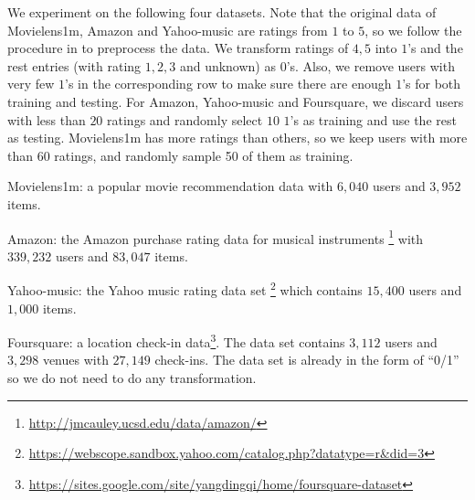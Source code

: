 \documentclass{article}
\begin{document}
We experiment on the following four datasets. 
Note that the original data of Movielens1m, Amazon and Yahoo-music are
ratings from $1$ to $5$, so we follow the procedure in \cite{rendle2009bpr,yu2017selection} to preprocess the data. 
We transform ratings of $4, 5$ into $1$'s and the rest entries (with rating $1, 2, 3$ and unknown) as $0$'s.
Also, we remove users with very few $1$'s in the corresponding row to make sure there are enough $1$'s for both training and testing. 
For Amazon, Yahoo-music and Foursquare, we discard users with less than $20$ ratings and randomly select $10$ $1$'s as training and use the rest as testing. 
Movielens1m has more ratings than others, so we keep users with more than $60$ ratings, and randomly sample 50 of them as training. 
\begin{compactitem}
\item Movielens1m: a popular movie recommendation data with $6,040$ users and $3,952$ items.%
\item Amazon: the Amazon purchase rating data for musical instruments \footnote{\url{http://jmcauley.ucsd.edu/data/amazon/}} with $339,232$ users and $83,047$ items. 
\item Yahoo-music: the Yahoo music rating data set \footnote{\url{https://webscope.sandbox.yahoo.com/catalog.php?datatype=r&did=3}} which contains $15,400$ users and $1,000$ items. 
\item Foursquare: 
a location check-in data\footnote{\url{https://sites.google.com/site/yangdingqi/home/foursquare-dataset}}. The data set contains $3,112$ users and $3,298$ venues with $27,149$ check-ins. The data set is already in the form of ``0/1'' so we do not need to do any transformation. 
\end{compactitem}
\end{document}
